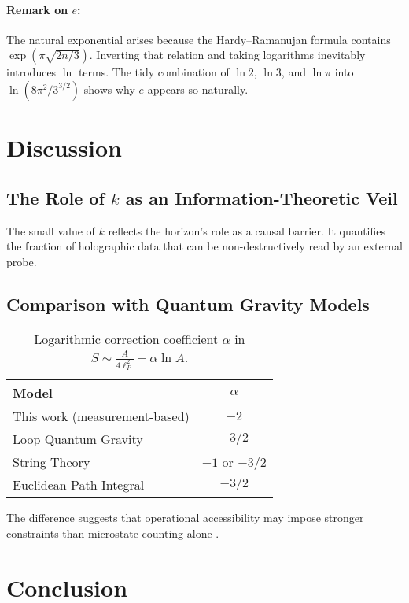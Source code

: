 \documentclass[12pt, letterpaper]{article}
\begin{document}
\paragraph{Remark on $e$:} The natural exponential arises because the Hardy–Ramanujan formula contains $\exp(\pi\sqrt{2n/3})$. Inverting that relation and taking logarithms inevitably introduces $\ln$ terms. The tidy combination of $\ln 2$, $\ln 3$, and $\ln \pi$ into $\ln(8\pi^2/3^{3/2})$ shows why $e$ appears so naturally.

\section{Discussion}

\subsection{The Role of $k$ as an Information-Theoretic Veil}

The small value of $k$ reflects the horizon's role as a causal barrier. It quantifies the fraction of holographic data that can be non-destructively read by an external probe.

\subsection{Comparison with Quantum Gravity Models}

\begin{table}[h!]
\centering
\caption{Logarithmic correction coefficient $\alpha$ in $S \sim \frac{A}{4\ell_P^2} + \alpha \ln A$.}
\label{tab:comparison}
\begin{tabular}{lc}
\toprule
\textbf{Model} & $\alpha$ \\
\midrule
This work (measurement-based) & $-2$ \\
Loop Quantum Gravity & $-3/2$ \\
String Theory & $-1$ or $-3/2$ \\
Euclidean Path Integral & $-3/2$ \\
\bottomrule
\end{tabular}
\end{table}

The difference suggests that operational accessibility may impose stronger constraints than microstate counting alone \cite{wald2001}.

\section{Conclusion}
\end{document}
